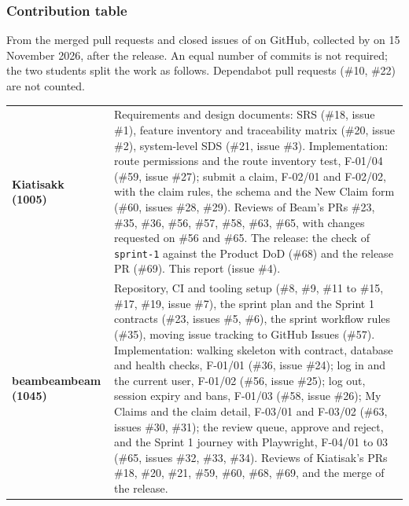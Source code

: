 \label{F:5}

\subsubsection*{Contribution table}

From the merged pull requests and closed issues of  on GitHub, collected by  on 15 November 2026, after the release.
An equal number of commits is not required; the two students split the work as follows.
Dependabot pull requests (\#10, \#22) are not counted.



\begin{center}\small
\begin{tabular}{@{}>{\bfseries}p{2.7cm}p{13.6cm}@{}}
\toprule
Kiatisakk (1005) & Requirements and design documents: SRS (\#18, issue \#1), feature inventory and traceability matrix (\#20, issue \#2), system-level SDS (\#21, issue \#3). Implementation: route permissions and the route inventory test, F-01/04 (\#59, issue \#27); submit a claim, F-02/01 and F-02/02, with the claim rules, the schema and the New Claim form (\#60, issues \#28, \#29). Reviews of Beam's PRs \#23, \#35, \#36, \#56, \#57, \#58, \#63, \#65, with changes requested on \#56 and \#65. The release: the check of \texttt{sprint-1} against the Product DoD (\#68) and the release PR (\#69). This report (issue \#4). \\
beambeambeam (1045) & Repository, CI and tooling setup (\#8, \#9, \#11 to \#15, \#17, \#19, issue \#7), the sprint plan and the Sprint 1 contracts (\#23, issues \#5, \#6), the sprint workflow rules (\#35), moving issue tracking to GitHub Issues (\#57). Implementation: walking skeleton with contract, database and health checks, F-01/01 (\#36, issue \#24); log in and the current user, F-01/02 (\#56, issue \#25); log out, session expiry and bans, F-01/03 (\#58, issue \#26); My Claims and the claim detail, F-03/01 and F-03/02 (\#63, issues \#30, \#31); the review queue, approve and reject, and the Sprint 1 journey with Playwright, F-04/01 to 03 (\#65, issues \#32, \#33, \#34). Reviews of Kiatisak's PRs \#18, \#20, \#21, \#59, \#60, \#68, \#69, and the merge of the release. \\
\bottomrule
\end{tabular}
\end{center}

